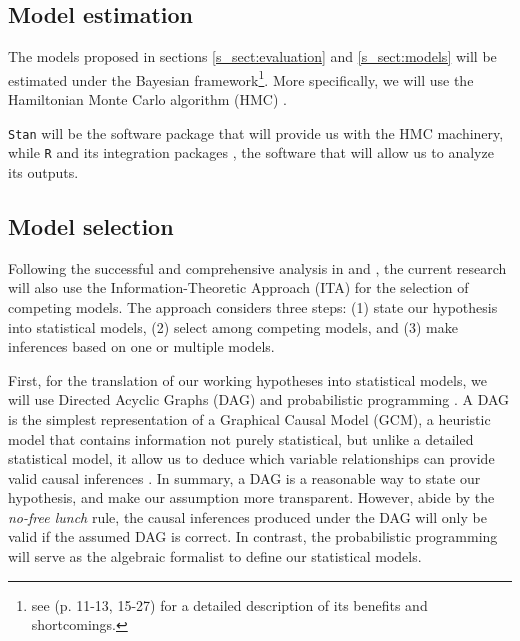 \subsection{Model estimation} \label{s_sect:estimation}
%
The models proposed in sections \ref{s_sect:evaluation} and \ref{s_sect:models} will be estimated under the Bayesian framework\footnote{see \citet{Rivera_2021} (p. 11-13, 15-27) for a detailed description of its benefits and shortcomings.}. More specifically, we will use the Hamiltonian Monte Carlo algorithm (HMC) \citep{Betancourt_et_al_2013, Duane_et_al_1987, Neal_2012}. 

\texttt{Stan} \citep{Stan_2020} will be the software package that will provide us with the HMC machinery, while \texttt{R} \citep{R_2015} and its integration packages \citep{RStan_2020}, the software that will allow us to analyze its outputs.
%
%
\subsection{Model selection} \label{s_sect:model_sel}
%
Following the successful and comprehensive analysis in \citet{vanDaal_2020} and \citet{Lesterhuis_2018}, the current research will also use the Information-Theoretic Approach (ITA) \citep{Anderson_2008, Chamberlain_1965} for the selection of competing models. The approach considers three steps: (1) state our hypothesis into statistical models, (2) select among competing models, and (3) make inferences based on one or multiple models.

First, for the translation of our working hypotheses into statistical models, we will use Directed Acyclic Graphs (DAG) and probabilistic programming \citep{Jaynes_2003}. A DAG is the simplest representation of a Graphical Causal Model (GCM), a heuristic model that contains information not purely statistical, but unlike a detailed statistical model, it allow us to deduce which variable relationships can provide valid causal inferences \citep{Hernan_et_al_2020, McElreath_2020}. In summary, a DAG is a reasonable way to state our hypothesis, and make our assumption more transparent. However, abide by the \textit{no-free lunch} rule, the causal inferences produced under the DAG will only be valid if the assumed DAG is correct. In contrast, the probabilistic programming will serve as the algebraic formalist to define our statistical models.

